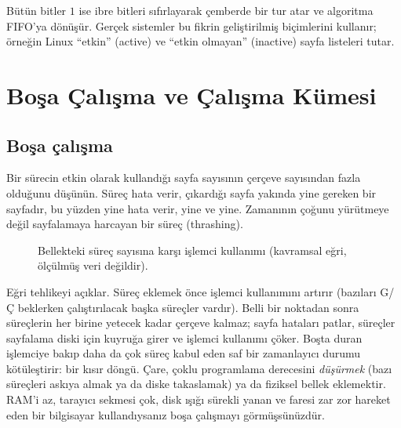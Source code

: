 Bütün bitler $1$ ise ibre bitleri sıfırlayarak çemberde bir tur atar ve algoritma FIFO'ya dönüşür. Gerçek sistemler bu fikrin geliştirilmiş biçimlerini kullanır; örneğin Linux ``etkin'' (active) ve ``etkin olmayan'' (inactive) sayfa listeleri tutar.

\section{Boşa Çalışma ve Çalışma Kümesi}

\subsection{Boşa çalışma}

Bir sürecin etkin olarak kullandığı sayfa sayısının çerçeve sayısından fazla olduğunu düşünün. Süreç hata verir, çıkardığı sayfa yakında yine gereken bir sayfadır, bu yüzden yine hata verir, yine ve yine. Zamanının çoğunu yürütmeye değil sayfalamaya harcayan bir süreç  (thrashing).

\begin{figure}[H]
\centering
{}
\caption{Bellekteki süreç sayısına karşı işlemci kullanımı (kavramsal eğri, ölçülmüş veri değildir).}
\end{figure}

Eğri tehlikeyi açıklar. Süreç eklemek önce işlemci kullanımını artırır (bazıları G/Ç beklerken çalıştırılacak başka süreçler vardır). Belli bir noktadan sonra süreçlerin her birine yetecek kadar çerçeve kalmaz; sayfa hataları patlar, süreçler sayfalama diski için kuyruğa girer ve işlemci kullanımı çöker. Boşta duran işlemciye bakıp daha da çok süreç kabul eden saf bir zamanlayıcı durumu kötüleştirir: bir kısır döngü. Çare, çoklu programlama derecesini \emph{düşürmek} (bazı süreçleri askıya almak ya da diske takaslamak) ya da fiziksel bellek eklemektir. RAM'i az, tarayıcı sekmesi çok, disk ışığı sürekli yanan ve faresi zar zor hareket eden bir bilgisayar kullandıysanız boşa çalışmayı görmüşsünüzdür.

